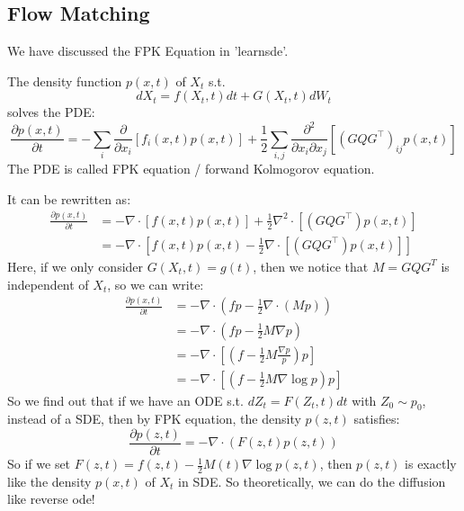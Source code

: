\subsection{Flow Matching}
We have discussed the FPK Equation in 'learnsde'. 
\begin{theorem}
    The density function $p(x, t)$ of $X_t$ s.t. 
    \begin{equation}
        dX_t = f(X_t, t)dt + G(X_t,t)dW_t
    \end{equation}
    solves the PDE:
    \begin{equation}
        \frac{\partial p(x, t)}{\partial t}=-\sum_{i} \frac{\partial}{\partial x_{i}}\left[f_{i}(x, t) p(x, t)\right]+\frac{1}{2} \sum_{i, j} \frac{\partial^{2}}{\partial x_{i} \partial x_{j}}\left[\left(G Q G^{\top}\right)_{i j} p(x, t)\right]
    \end{equation}
    The PDE is called FPK equation / forwand Kolmogorov equation.
\end{theorem}
It can be rewritten as:
\begin{equation}
    \begin{aligned}
        \frac{\partial p(x, t)}{\partial t} &= -\nabla\cdot\left[f(x, t) p(x, t)\right]+\frac{1}{2} \nabla^2\cdot\left[\left(G Q G^{\top}\right) p(x, t)\right] \\
        &=-\nabla\cdot\left[f(x, t) p(x, t)-\frac{1}{2} \nabla\cdot\left[\left(G Q G^{\top}\right) p(x, t)\right]\right]
    \end{aligned}
\end{equation}
Here, if we only consider $G(X_t, t)=g(t)$, then we notice that $M=GQG^T$ is independent of $X_t$, so we can write:
\begin{equation}
    \begin{aligned}
        \frac{\partial p(x, t)}{\partial t} &= -\nabla\cdot\left(fp-\frac{1}{2}\nabla\cdot (Mp)\right)\\
        &=-\nabla\cdot\left(fp-\frac{1}{2}M\nabla p\right)\\
        &=-\nabla\cdot\left[\left(f-\frac{1}{2}M\frac{\nabla p}{p}\right)p\right]\\
        &=-\nabla\cdot\left[\left(f-\frac{1}{2}M\nabla\log p\right)p\right]
    \end{aligned}
\end{equation}
So we find out that if we have an ODE s.t. $dZ_t=F(Z_t, t)dt$ with $Z_0 \sim p_0$, instead of a SDE, then by FPK equation, the density $p(z, t)$ satisfies:
\begin{equation}
    \frac{\partial p(z, t)}{\partial t}=-\nabla\cdot\left(F(z, t)p(z, t)\right)
\end{equation}
So if we set $F(z, t)=f(z, t) - \frac{1}{2}M(t)\nabla\log p(z, t)$, then $p(z, t)$ is exactly like the density $p(x, t)$ of $X_t$ in SDE. 
So theoretically, we can do the diffusion like reverse ode!

